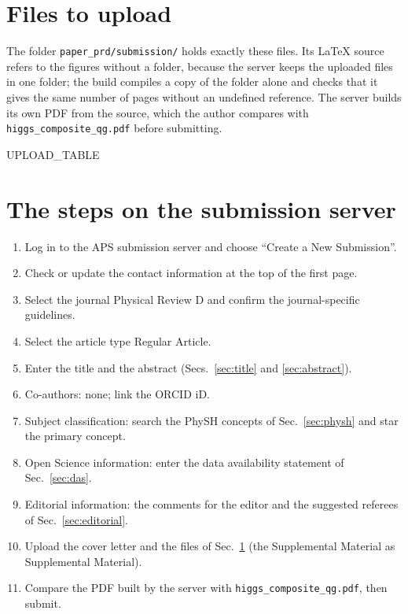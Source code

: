 \documentclass[11pt]{article}
\begin{document}
\section{Files to upload}
\label{sec:files}

The folder \texttt{paper\_prd/submission/} holds exactly these files. Its LaTeX source refers to the figures without a
folder, because the server keeps the uploaded files in one folder; the build compiles a copy of the folder alone and checks
that it gives the same number of pages without an undefined reference. The server builds its own PDF from the source,
which the author compares with \texttt{higgs\_composite\_qg.pdf} before submitting.

{{UPLOAD_TABLE}}

\section{The steps on the submission server}
\label{sec:steps}

\begin{enumerate}
\item Log in to the APS submission server and choose ``Create a New Submission''.
\item Check or update the contact information at the top of the first page.
\item Select the journal Physical Review D and confirm the journal-specific guidelines.
\item Select the article type Regular Article.
\item Enter the title and the abstract (Secs.~\ref{sec:title} and \ref{sec:abstract}).
\item Co-authors: none; link the ORCID iD.
\item Subject classification: search the PhySH concepts of Sec.~\ref{sec:physh} and star the primary concept.
\item Open Science information: enter the data availability statement of Sec.~\ref{sec:das}.
\item Editorial information: the comments for the editor and the suggested referees of Sec.~\ref{sec:editorial}.
\item Upload the cover letter and the files of Sec.~\ref{sec:files} (the Supplemental Material as Supplemental Material).
\item Compare the PDF built by the server with \texttt{higgs\_composite\_qg.pdf}, then submit.
\end{enumerate}
\end{document}
